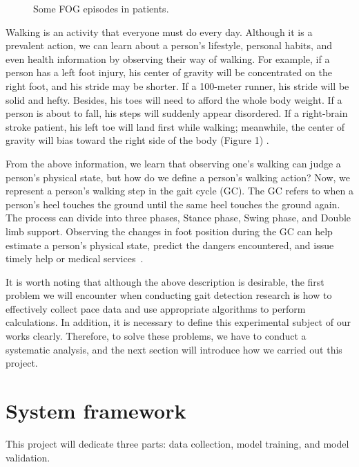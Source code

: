 \documentclass[10pt,twocolumn,letterpaper]{article}
\begin{document}
\begin{figure}[t]
    \centering
    \caption{Some FOG episodes in patients.}
    \label{fig:f1}
\end{figure}

Walking is an activity that everyone must do every day. Although it is a prevalent action, we can learn about a person's lifestyle, personal habits, and even health information by observing their way of walking. For example, if a person has a left foot injury, his center of gravity will be concentrated on the right foot, and his stride may be shorter. If a 100-meter runner, his stride will be solid and hefty. Besides, his toes will need to afford the whole body weight. If a person is about to fall, his steps will suddenly appear disordered. If a right-brain stroke patient, his left toe will land first while walking; meanwhile, the center of gravity will bias toward the right side of the body (Figure 1) .

From the above information, we learn that observing one's walking can judge a person's physical state, but how do we define a person's walking action? Now, we represent a person's walking step in the gait cycle (GC). The GC refers to when a person's heel touches the ground until the same heel touches the ground again. The process can divide into three phases, Stance phase, Swing phase, and Double limb support. Observing the changes in foot position during the GC can help estimate a person's physical state, predict the dangers encountered, and issue timely help or medical services~\cite{CAMPS2018119}.

It is worth noting that although the above description is desirable, the first problem we will encounter when conducting gait detection research is how to effectively collect pace data and use appropriate algorithms to perform calculations. In addition, it is necessary to define this experimental subject of our works clearly. Therefore, to solve these problems, we have to conduct a systematic analysis, and the next section will introduce how we carried out this project.

\section{System framework}
\label{sec:framework}

This project will dedicate three parts: data collection, model training, and model validation.
\end{document}
